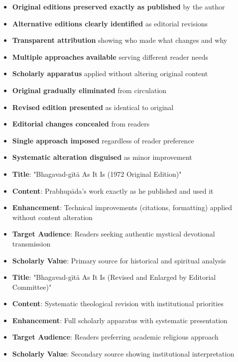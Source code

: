 \documentclass[12pt,twoside]{book}
\begin{document}
\begin{itemize}
\item \textbf{\textbf{Original editions preserved exactly as published}} by the author
\item \textbf{\textbf{Alternative editions clearly identified}} as editorial revisions
\item \textbf{\textbf{Transparent attribution}} showing who made what changes and why
\item \textbf{\textbf{Multiple approaches available}} serving different reader needs
\item \textbf{\textbf{Scholarly apparatus}} applied without altering original content

\item \textbf{\textbf{Original gradually eliminated}} from circulation
\item \textbf{\textbf{Revised edition presented}} as identical to original
\item \textbf{\textbf{Editorial changes concealed}} from readers
\item \textbf{\textbf{Single approach imposed}} regardless of reader preference
\item \textbf{\textbf{Systematic alteration disguised}} as minor improvement

\item \textbf{\textbf{Title}}: "Bhagavad-gītā As It Is (1972 Original Edition)"
\item \textbf{\textbf{Content}}: Prabhupāda's work exactly as he published and used it
\item \textbf{\textbf{Enhancement}}: Technical improvements (citations, formatting) applied without content alteration
\item \textbf{\textbf{Target Audience}}: Readers seeking authentic mystical devotional transmission
\item \textbf{\textbf{Scholarly Value}}: Primary source for historical and spiritual analysis

\item \textbf{\textbf{Title}}: "Bhagavad-gītā As It Is (Revised and Enlarged by Editorial Committee)"
\item \textbf{\textbf{Content}}: Systematic theological revision with institutional priorities
\item \textbf{\textbf{Enhancement}}: Full scholarly apparatus with systematic presentation
\item \textbf{\textbf{Target Audience}}: Readers preferring academic religious approach
\item \textbf{\textbf{Scholarly Value}}: Secondary source showing institutional interpretation


\end{itemize}
\end{document}
